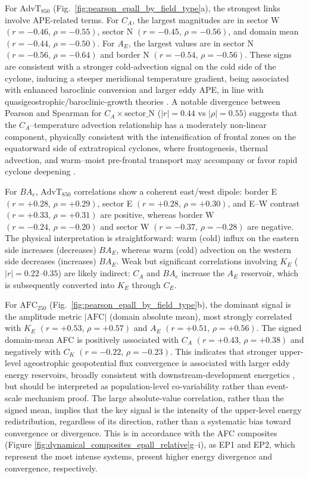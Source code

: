 \documentclass[pdflatex,sn-chicago]{sn-jnl}%
\theoremstyle{plain}
\theoremstyle{definition}
\theoremstyle{remark}
\theoremstyle{definition}
\begin{document}
For $\mathrm{AdvT}_{850}$ (Fig.~\ref{fig:pearson_epall_by_field_type}a), the strongest links involve APE-related terms. For $C_A$, the largest magnitudes are in sector W $(r=-0.46,\,\rho=-0.55)$, sector N $(r=-0.45,\,\rho=-0.56)$, and domain mean $(r=-0.44,\,\rho=-0.50)$. For $A_E$, the largest values are in sector N $(r=-0.56,\,\rho=-0.64)$ and border N $(r=-0.54,\,\rho=-0.56)$. These signs are consistent with a stronger cold-advection signal on the cold side of the cyclone, inducing a steeper meridional temperature gradient, being associated with enhanced baroclinic conversion and larger eddy APE, in line with quasigeostrophic/baroclinic-growth theories \citep{lorenz1955available,davies2015quasigeostrophic}. A notable divergence between Pearson and Spearman for $C_A \times \mathrm{sector\_N}$ ($|r| = 0.44$ vs $|\rho| = 0.55$) suggests that the $C_A$–temperature advection relationship has a moderately non-linear component, physically consistent with the intensification of frontal zones on the equatorward side of extratropical cyclones, where frontogenesis, thermal advection, and warm--moist pre-frontal transport may accompany or favor rapid cyclone deepening \citep{dacre2025kinematic}.

For $BA_e$, $\mathrm{AdvT}_{850}$ correlations show a coherent east/west dipole: border E $(r=+0.28,\,\rho=+0.29)$, sector E $(r=+0.28,\,\rho=+0.30)$, and E--W contrast $(r=+0.33,\,\rho=+0.31)$ are positive, whereas border W $(r=-0.24,\,\rho=-0.20)$ and sector W $(r=-0.37,\,\rho=-0.28)$ are negative. The physical interpretation is straightforward: warm (cold) influx on the eastern side increases (decreases) $BA_E$, whereas warm (cold) advection on the western side decreases (increases) $BA_E$. Weak but significant correlations involving $K_E$ ($|r| = 0.22$–$0.35$) are likely indirect: $C_A$ and $BA_e$ increase the $A_E$ reservoir, which is subsequently converted into $K_E$ through $C_E$.


For $\mathrm{AFC}_{250}$ (Fig.~\ref{fig:pearson_epall_by_field_type}b), the dominant signal is the amplitude metric $|\mathrm{AFC}|$ (domain absolute mean), most strongly correlated with $K_E$ $(r=+0.53,\,\rho=+0.57)$ and $A_E$ $(r=+0.51,\,\rho=+0.56)$. The signed domain-mean AFC is positively associated with $C_A$ $(r=+0.43,\,\rho=+0.38)$ and negatively with $C_K$ $(r=-0.22,\,\rho=-0.23)$. This indicates that stronger upper-level ageostrophic geopotential flux convergence is associated with larger eddy energy reservoirs, broadly consistent with downstream-development energetics \citep{orlanski1991life,orlanski1993ageostrophic}, but should be interpreted as population-level co-variability rather than event-scale mechanism proof. The large absolute-value correlation, rather than the signed mean, implies that the key signal is the intensity of the upper-level energy redistribution, regardless of its direction, rather than a systematic bias toward convergence or divergence. This is in accordance with the AFC composites (Figure \ref{fig:dynamical_composites_epall_relative}g--i), as EP1 and EP2, which represent the most intense systems, present higher energy divergence and convergence, respectively.
\end{document}

